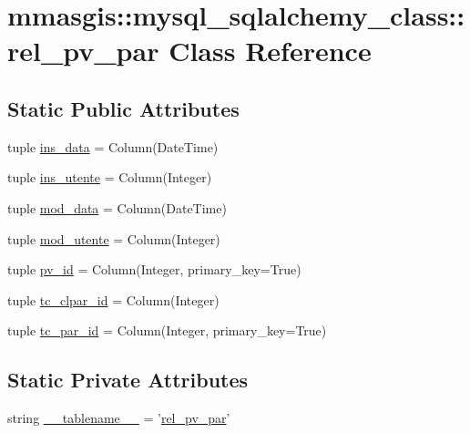 \hypertarget{classmmasgis_1_1mysql__sqlalchemy__class_1_1rel__pv__par}{
\section{mmasgis::mysql\_\-sqlalchemy\_\-class::rel\_\-pv\_\-par Class Reference}
\label{classmmasgis_1_1mysql__sqlalchemy__class_1_1rel__pv__par}
}
\subsection*{Static Public Attributes}
\begin{DoxyCompactItemize}
\item 
tuple \hyperlink{classmmasgis_1_1mysql__sqlalchemy__class_1_1rel__pv__par_ac77784875ab03ec1a333b81666bf5f85}{ins\_\-data} = Column(DateTime)
\item 
tuple \hyperlink{classmmasgis_1_1mysql__sqlalchemy__class_1_1rel__pv__par_a8d1e7ddddd71565efd004414c115dcbc}{ins\_\-utente} = Column(Integer)
\item 
tuple \hyperlink{classmmasgis_1_1mysql__sqlalchemy__class_1_1rel__pv__par_aa6c15cdb93add6e98b1fac8a92ce5f22}{mod\_\-data} = Column(DateTime)
\item 
tuple \hyperlink{classmmasgis_1_1mysql__sqlalchemy__class_1_1rel__pv__par_adf2ab804c2d028cba13d0d542ba997cf}{mod\_\-utente} = Column(Integer)
\item 
tuple \hyperlink{classmmasgis_1_1mysql__sqlalchemy__class_1_1rel__pv__par_aa2ac354763197d11a1b597f4907e142f}{pv\_\-id} = Column(Integer, primary\_\-key=True)
\item 
tuple \hyperlink{classmmasgis_1_1mysql__sqlalchemy__class_1_1rel__pv__par_ae516341edcd41cc2a115cb9150c9745b}{tc\_\-clpar\_\-id} = Column(Integer)
\item 
tuple \hyperlink{classmmasgis_1_1mysql__sqlalchemy__class_1_1rel__pv__par_a3be65bd9edd35a188477630e176fac47}{tc\_\-par\_\-id} = Column(Integer, primary\_\-key=True)
\end{DoxyCompactItemize}
\subsection*{Static Private Attributes}
\begin{DoxyCompactItemize}
\item 
string \hyperlink{classmmasgis_1_1mysql__sqlalchemy__class_1_1rel__pv__par_a042c56b609eb30642b433b1dbedbb4b4}{\_\-\_\-tablename\_\-\_\-} = '\hyperlink{classmmasgis_1_1mysql__sqlalchemy__class_1_1rel__pv__par}{rel\_\-pv\_\-par}'
\end{DoxyCompactItemize}


